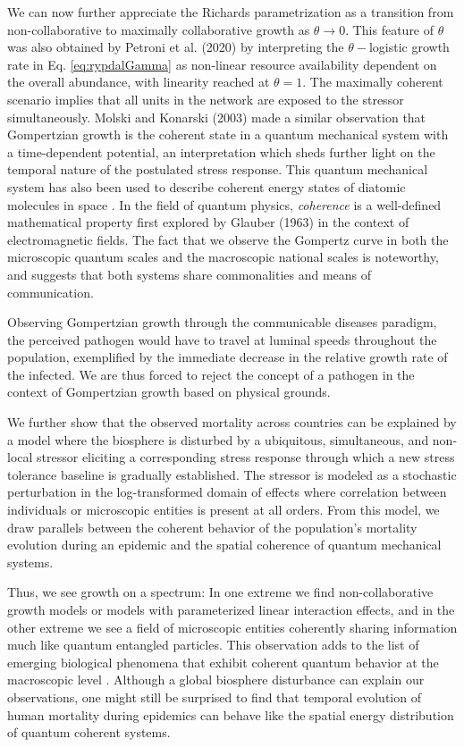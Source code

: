 \documentclass{article}
\begin{document}
We can now further appreciate the Richards parametrization as a transition from non-collaborative to maximally collaborative growth as $\theta \rightarrow 0$. 
This feature of $\theta$ was also obtained by Petroni et al. (2020) \cite{petroni2020logistic} by interpreting the $\theta-$logistic growth rate in Eq. \ref{eq:rypdalGamma} as non-linear resource availability dependent on the overall abundance, with linearity reached at $\theta=1$. The maximally coherent scenario implies that all units in the network are exposed to the stressor simultaneously.
Molski and Konarski (2003) \cite{molski2003coherent} made a similar observation that Gompertzian growth is the coherent state in a quantum mechanical system with a time-dependent potential, an interpretation which sheds further light on the temporal nature of the postulated stress response.
This quantum mechanical system has also been used to describe coherent energy states of diatomic molecules in space \cite{morse1929diatomic}. 
In the field of quantum physics, \emph{coherence} is a well-defined mathematical property first explored by Glauber (1963) \cite{glauber1963coherent} in the context of electromagnetic fields. The fact that we observe the Gompertz curve in both the microscopic quantum scales and the macroscopic national scales is noteworthy, and suggests that both systems share commonalities and means of communication.

Observing Gompertzian growth through the communicable diseases paradigm, the perceived pathogen would have to travel at luminal speeds throughout the population, exemplified by the immediate decrease in the relative growth rate of the infected. We are thus forced to reject the concept of a pathogen in the context of Gompertzian growth based on physical grounds.

We further show that the observed mortality across countries can be explained by a model where the biosphere is disturbed by a ubiquitous, simultaneous, and non-local stressor eliciting a corresponding stress response through which a new stress tolerance baseline is gradually established. The stressor is modeled as a stochastic perturbation in the log-transformed domain of effects where correlation between individuals or microscopic entities is present at all orders. From this model, we draw parallels between the coherent behavior of the population's mortality evolution during an epidemic and the spatial coherence of quantum mechanical systems.

Thus, we see growth on a spectrum: In one extreme we find non-collaborative growth models or models with parameterized linear interaction effects, and in the other extreme we see a field of microscopic entities coherently sharing information much like quantum entangled particles. This observation adds to the list of emerging biological phenomena that exhibit coherent quantum behavior at the macroscopic level \cite{lambert2013quantum}. Although a global biosphere disturbance can explain our observations, one might still be surprised to find that temporal evolution of human mortality during epidemics can behave like the spatial energy distribution of quantum coherent systems.
\end{document}

